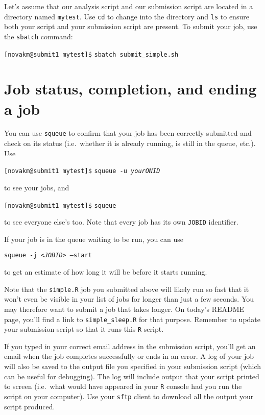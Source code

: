 \documentclass[12pt,letterpaper]{article}
\begin{document}
Let's assume that our analysis script and our submission script are located in a directory named \texttt{mytest}.
Use \texttt{cd} to change into the directory and \texttt{ls} to ensure both your script and your submission script are present.
To submit your job, use the \texttt{sbatch} command:

\texttt{[novakm@submit1 mytest]\$} \texttt{sbatch submit\_simple.sh}
\\


\section{Job status, completion, and ending a job}

\noindent
You can use \texttt{squeue} to confirm that your job has been correctly submitted and check on its status
(i.e.~whether it is already running, is still in the queue, etc.).
Use

\texttt{[novakm@submit1 mytest]\$} \texttt{squeue -u \textit{yourONID}}

\noindent
to see your jobs, and

\texttt{[novakm@submit1 mytest]\$} \texttt{squeue}

\noindent
to see everyone else's too.
Note that every job has its own \texttt{JOBID} identifier.

\noindent
If your job is in the queue waiting to be run, you can use 

\texttt{squeue -j <\emph{JOBID}> --start}

\noindent
to get an estimate of how long it will be before it starts running.

\begin{tcolorbox}[breakable, enhanced, before upper={\parindent15pt}]
	\noindent
	Note that the \texttt{simple.R} job you submitted above will likely run so fast that it won't even be visible in your list of jobs for longer than just a few seconds.  You may therefore want to submit a job that takes longer.  On today's README page, you'll find a link to \texttt{simple\_sleep.R} for that purpose.  Remember to update your submission script so that it runs this \texttt{R} script.
\end{tcolorbox}

If you typed in your correct email address in the submission script, you'll get an email when the job completes successfully or ends in an error.
A log of your job will also be saved to the output file you specified in your submission script (which can be useful for debugging).
The log will include output that your script printed to screen (i.e.~what would have appeared in your \texttt{R} console had you run the script on your computer).
Use your \texttt{sftp} client to download all the output your script produced.
\end{document}

